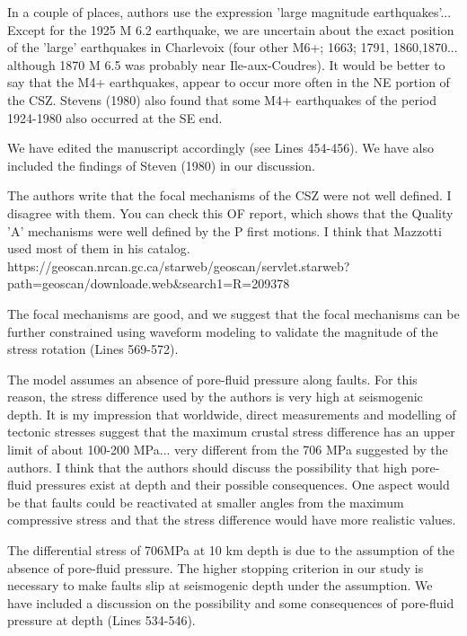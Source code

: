 \documentclass[12pt]{article}
\begin{document}
\begin{response}{In a couple of places, authors use the expression 'large magnitude earthquakes'... Except for the 1925 M 6.2 earthquake, we are uncertain about the exact position of the 'large' earthquakes in Charlevoix (four other M6+; 1663; 1791, 1860,1870... although 1870 M 6.5 was probably near Ile-aux-Coudres). It would be better to say that the M4+ earthquakes, appear to occur more often in the NE portion of the CSZ. Stevens (1980) also found that some M4+ earthquakes of the period 1924-1980 also occurred at the SE end.}

  We have edited the manuscript accordingly (see Lines 454-456). We have also included the findings of Steven (1980) in our discussion.
\end{response}

\begin{response}{The authors write that the focal mechanisms of the CSZ were not well defined. I disagree with them. You can check this OF report, which shows that the Quality 'A' mechanisms were well defined by the P first motions. I think that Mazzotti used most of them in his catalog.
https://geoscan.nrcan.gc.ca/starweb/geoscan/servlet.starweb?
path=geoscan/downloade.web\&search1=R=209378}

 The focal mechanisms are good, and we suggest that the focal mechanisms can be further constrained using waveform modeling to validate the magnitude of the stress rotation (Lines 569-572).
\end{response}

\begin{response}{The model assumes an absence of pore-fluid pressure along faults. For this reason, the stress difference used by the authors is very high at seismogenic depth. It is my impression that worldwide, direct measurements and modelling of tectonic stresses suggest that the maximum crustal stress difference has an upper limit of about 100-200 MPa... very different from the 706 MPa suggested by the authors.
I think that the authors should discuss the possibility that high pore-fluid pressures exist at depth and their possible consequences. One aspect would be that faults could be reactivated at smaller angles from the maximum compressive stress and that the stress difference would have more realistic values.}

  The differential stress of 706MPa at 10 km depth is due to the assumption of the absence of pore-fluid pressure. The higher stopping criterion in our study is necessary to make faults slip at seismogenic depth under the assumption. We have included a discussion on the possibility and some consequences of pore-fluid pressure at depth (Lines 534-546).
\end{response}
\end{document}
